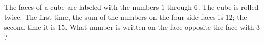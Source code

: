 The faces of a cube are labeled with the numbers $1$ through $6$. The cube is rolled twice. The first time, the sum of the numbers on the four side faces is $12$; the second time it is $15$. What number is written on the face opposite the face with $3$?
